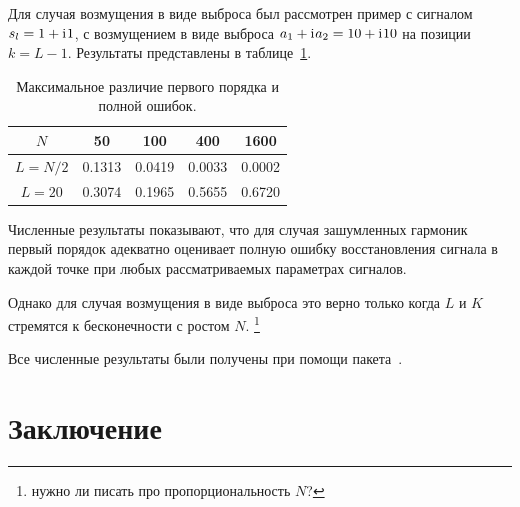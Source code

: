 \documentclass{spisok-article}
\begin{document}
Для случая возмущения в виде выброса был рассмотрен пример с сигналом $s_l = 1 + \mathrm{i}\mkern1mu 1$, с возмущением в виде выброса $a_1 + \mathrm{i}\mkern1mu a_2 = 10 + \mathrm{i}\mkern1mu 10$ на позиции $k = L - 1$. Результаты представлены в таблице~\ref{tab:const_outl}.

\begin{table}[H]
	\begin{center}
		\caption{Максимальное различие первого порядка и полной ошибок.}
		\label{tab:const_outl}
		\begin{tabular}{|c|c|c|c|c|}
			\hline
			$N$	& 50 & 100 & 400 & 1600 \\
			\hline
			$L = N / 2$ & 0.1313  & 0.0419  & 0.0033 & 0.0002 \\
			\hline
			$L = 20$ & 0.3074  & 0.1965  & 0.5655 & 0.6720 \\
			\hline
		\end{tabular}
	\end{center}
\end{table}

Численные результаты показывают, что для случая зашумленных гармоник первый порядок адекватно оценивает полную ошибку восстановления сигнала в каждой точке при любых рассматриваемых параметрах сигналов.

Однако для случая возмущения в виде выброса это верно только когда $L$ и $K$ стремятся к бесконечности с ростом $N$. \footnote{нужно ли писать про пропорциональность $N$?}

Все численные результаты были получены при помощи пакета~\cite{Korobeynikov.etal2014}.


\section{Заключение}
\label{sec:conclusions}
\end{document}
